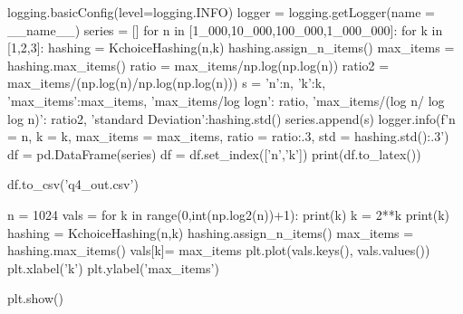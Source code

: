 \documentclass{homeworg}
\begin{document}
\begin{python}
    logging.basicConfig(level=logging.INFO)
    logger = logging.getLogger(name = __name__)
    series = []
    for n in [1_000,10_000,100_000,1_000_000]:
        for k in [1,2,3]:
            hashing = KchoiceHashing(n,k)
            hashing.assign_n_items()
            max_items = hashing.max_items()
            ratio = max_items/np.log(np.log(n))
            ratio2 = max_items/(np.log(n)/np.log(np.log(n)))
            s = {
                'n':n,
                'k':k,
                'max_items':max_items,
                'max_items/log logn': ratio,
                'max_items/(log n/ log log n)': ratio2,
                'standard Deviation':hashing.std()
            }
            series.append(s) 
            logger.info(f'n = {n}, k = {k}, max_items = {max_items}, ratio = {ratio:.3}, std = {hashing.std():.3}')
    df = pd.DataFrame(series)
    df = df.set_index(['n','k'])
    print(df.to_latex())

    df.to_csv('q4_out.csv')
    
    
    n = 1024
    vals = {}
    for k in range(0,int(np.log2(n))+1):
        print(k)
        k = 2**k
        print(k)
        hashing = KchoiceHashing(n,k)
        hashing.assign_n_items()
        max_items = hashing.max_items()
        vals[k]= max_items
    plt.plot(vals.keys(), vals.values())
    plt.xlabel('k')
    plt.ylabel('max_items')
    
    plt.show()
\end{python}
\end{document}
